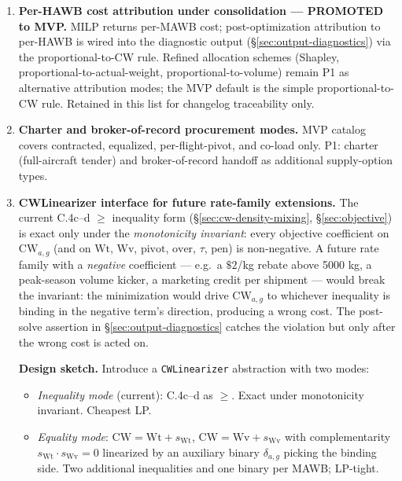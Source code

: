 \documentclass[11pt,a4paper]{article}
\theoremstyle{definition}
\begin{document}
\begin{enumerate}
{        as a separate arc.} MVP folds in-transit clearance dwell into
        $\delta_a$ of the deconsolidation-dwell arc as data only; P1 models
        it as a distinct arc with its own cost and stochastic dwell.
  \item \label{item:per-hawb-cost-attribution} \textbf{Per-HAWB cost
        attribution under consolidation --- PROMOTED to MVP.} MILP returns
        per-MAWB cost; post-optimization attribution to per-HAWB is wired
        into the diagnostic output (\S\ref{sec:output-diagnostics}) via
        the proportional-to-CW rule. Refined allocation schemes (Shapley,
        proportional-to-actual-weight, proportional-to-volume) remain P1
        as alternative attribution modes; the MVP default is the simple
        proportional-to-CW rule. Retained in this list for changelog
        traceability only.
  \item \label{item:charter-and-bor} \textbf{Charter and broker-of-record
        procurement modes.} MVP catalog covers contracted, equalized,
        per-flight-pivot, and co-load only. P1: charter (full-aircraft tender)
        and broker-of-record handoff as additional supply-option types.
  \item \label{item:cwlinearizer-interface} \textbf{CWLinearizer interface
        for future rate-family extensions.} The current C.4c--d $\geq$
        inequality form (\S\ref{sec:cw-density-mixing}, \S\ref{sec:objective})
        is exact only under the \emph{monotonicity invariant}: every
        objective coefficient on $\text{CW}_{a,g}$ (and on $\text{Wt}$,
        $\text{Wv}$, $\text{pivot}$, $\text{over}$, $\tau$, $\text{pen}$)
        is non-negative. A future rate family with a \emph{negative}
        coefficient --- e.g.\ a $\$2$/kg rebate above 5000 kg, a
        peak-season volume kicker, a marketing credit per shipment ---
        would break the invariant: the minimization would drive
        $\text{CW}_{a,g}$ to whichever inequality is binding in the
        negative term's direction, producing a wrong cost. The post-solve
        assertion in \S\ref{sec:output-diagnostics} catches the
        violation but only after the wrong cost is acted on.

  \textbf{Design sketch.} Introduce a \texttt{CWLinearizer} abstraction
  with two modes:
    \begin{itemize}[noitemsep]
      \item \emph{Inequality mode} (current): C.4c--d as $\geq$. Exact
            under monotonicity invariant. Cheapest LP.
      \item \emph{Equality mode}: $\text{CW} = \text{Wt} + s_{\text{Wt}}$,
            $\text{CW} = \text{Wv} + s_{\text{Wv}}$ with complementarity
            $s_{\text{Wt}} \cdot s_{\text{Wv}} = 0$ linearized by an
            auxiliary binary $\delta_{a,g}$ picking the binding side. Two
            additional inequalities and one binary per MAWB; LP-tight.
    \end{itemize}


\end{enumerate}
\end{document}
